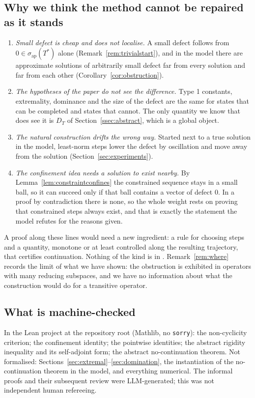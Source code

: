 \subsection*{Why we think the method cannot be repaired as it stands}
\begin{enumerate}
\item \emph{Small defect is cheap and does not localise.} A small defect follows from
$0\in\sigma_{\mathrm{ap}}(T^*)$ alone (Remark~\ref{rem:trivialstart}), and in the model there
are approximate solutions of arbitrarily small defect far from every solution and far from each
other (Corollary~\ref{cor:obstruction}).
\item \emph{The hypotheses of the paper do not see the difference.} Type 1 constants,
extremality, dominance and the size of the defect are the same for states that can be
completed and states that cannot. The only quantity we know that does see it is $D_T$ of
Section~\ref{ssec:abstract}, which is a global object.
\item \emph{The natural construction drifts the wrong way.} Started next to a true solution in
the model, least-norm steps lower the defect by oscillation and move away from the solution
(Section~\ref{sec:experiments}).
\item \emph{The confinement idea needs a solution to exist nearby.} By
Lemma~\ref{lem:constraintconfines} the constrained sequence stays in a small ball, so it can
succeed only if that ball contains a vector of defect $0$. In a proof by contradiction there is
none, so the whole weight rests on proving that constrained steps always exist, and that is
exactly the statement the model refutes for the reasons given.
\end{enumerate}
A proof along these lines would need a new ingredient: a rule for choosing steps and a quantity,
monotone or at least controlled along the resulting trajectory, that certifies continuation.
Nothing of the kind is in \paper{}. Remark~\ref{rem:where} records the limit of what we have
shown: the obstruction is exhibited in operators with many reducing subspaces, and we have no
information about what the construction would do for a transitive operator.

\subsection*{What is machine-checked}
In the Lean project at the repository root (Mathlib, no \texttt{sorry}): the non-cyclicity
criterion; the confinement identity; the pointwise identities; the abstract rigidity
inequality and its self-adjoint form; the abstract no-continuation theorem. Not formalised:
Sections~\ref{sec:extremal}--\ref{sec:domination}, the instantiation of the no-continuation
theorem in the model, and everything numerical. The informal proofs and their subsequent
review were LLM-generated; this was not independent human refereeing.
